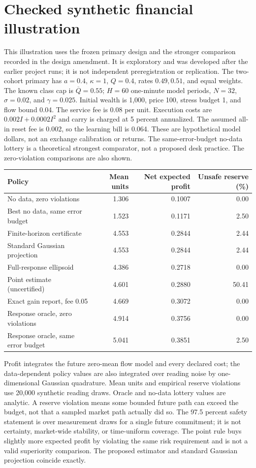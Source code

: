 \section*{Checked synthetic financial illustration}
This illustration uses the frozen primary design and the stronger comparison
recorded in the design amendment. It is exploratory and was developed after
the earlier project runs; it is not independent preregistration or replication.
The two-cohort primary has $a=0.4$, $\kappa=1$, $Q=0.4$, rates
$0.49,0.51$, and equal weights. The known class cap is $\overline Q=0.55$;
$H=60$ one-minute model periods, $N=32$, $\sigma=0.02$, and
$\gamma=0.025$. Initial wealth is 1,000, price 100, stress budget 1,
and flow bound 0.04. The service fee is 0.08 per unit. Execution costs are
$0.002I+0.0002I^2$ and carry is charged at 5 percent annualized.
The assumed all-in reset fee is 0.002, so the learning bill is 0.064.
These are hypothetical model dollars, not an exchange calibration or returns.
The same-error-budget no-data lottery is a theoretical strongest comparator,
not a proposed desk practice. The zero-violation comparisons are also shown.

\begin{center}\footnotesize
\begin{tabular}{p{}rrr}
\toprule
Policy & Mean units & Net expected profit & Unsafe reserve (\%)\\
\midrule
No data, zero violations & 1.306 & 0.1007 & 0.00\\
Best no data, same error budget & 1.523 & 0.1171 & 2.50\\
Finite-horizon certificate & 4.553 & 0.2844 & 2.44\\
Standard Gaussian projection & 4.553 & 0.2844 & 2.44\\
Full-response ellipsoid & 4.386 & 0.2718 & 0.00\\
Point estimate (uncertified) & 4.601 & 0.2880 & 50.41\\
Exact gain report, fee 0.05 & 4.669 & 0.3072 & 0.00\\
Response oracle, zero violations & 4.914 & 0.3756 & 0.00\\
Response oracle, same error budget & 5.041 & 0.3851 & 2.50\\
\bottomrule\end{tabular}\end{center}
Profit integrates the future zero-mean flow model and every declared cost;
the data-dependent policy values are also integrated over reading noise by
one-dimensional Gaussian quadrature. Mean units and empirical reserve
violations use 20,000 synthetic reading draws. Oracle and no-data lottery
values are analytic. A reserve violation means some bounded future path can
exceed the budget, not that a sampled market path actually did so.
The 97.5 percent safety statement is over measurement draws for a single
future commitment; it is not certainty, market-wide stability, or time-uniform
coverage. The point rule buys slightly more expected profit by violating the
same risk requirement and is not a valid superiority comparison.
The proposed estimator and standard Gaussian projection coincide exactly.

